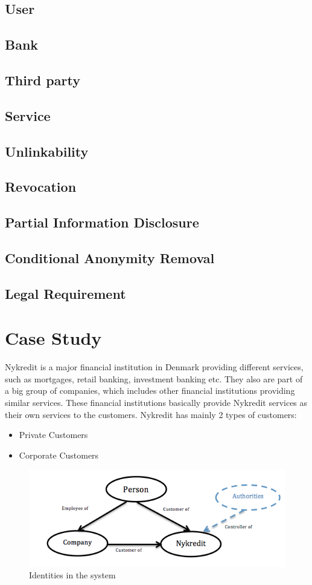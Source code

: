 \subsection{User}
\subsection{Bank}
\subsection{Third party}
\subsection{Service}
\subsection{Unlinkability}
\subsection{Revocation}
\subsection{Partial Information Disclosure}
\subsection{Conditional Anonymity Removal}
\subsection{Legal Requirement}
\section{Case Study}
Nykredit is a major financial institution in Denmark providing different services, such as mortgages, retail banking, investment banking etc. They also are part of a big group of companies, which includes other financial institutions providing similar services. These financial institutions basically provide Nykredit services as their own services to the customers.
Nykredit has mainly 2 types of customers:
\begin{itemize}
\item Private Customers
\item Corporate Customers
\end{itemize}
\begin{figure}[h]
	\centering
	\includegraphics[width=\textwidth]{figures/Customers}
	\caption{Identities in the system}
	\label{fig:Customers}
\end{figure}
